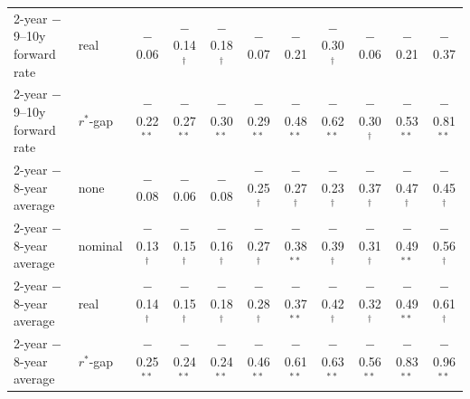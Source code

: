\begin{tabular}{llccccccccc}
2-year $-$ 9--10y forward rate & real & $-$0.06 & $-$0.14$^{\dagger}$ & $-$0.18$^{\dagger}$ & $-$0.07 & $-$0.21 & $-$0.30$^{\dagger}$ & $-$0.06 & $-$0.21 & $-$0.37 \\
2-year $-$ 9--10y forward rate & $r^*$-gap & $-$0.22$^{**}$ & $-$0.27$^{**}$ & $-$0.30$^{**}$ & $-$0.29$^{**}$ & $-$0.48$^{**}$ & $-$0.62$^{**}$ & $-$0.30$^{\dagger}$ & $-$0.53$^{**}$ & $-$0.81$^{**}$ \\
\midrule
2-year $-$ 8-year average & none & $-$0.08 & $-$0.06 & $-$0.08 & $-$0.25$^{\dagger}$ & $-$0.27$^{\dagger}$ & $-$0.23$^{\dagger}$ & $-$0.37$^{\dagger}$ & $-$0.47$^{\dagger}$ & $-$0.45$^{\dagger}$ \\
2-year $-$ 8-year average & nominal & $-$0.13$^{\dagger}$ & $-$0.15$^{\dagger}$ & $-$0.16$^{\dagger}$ & $-$0.27$^{\dagger}$ & $-$0.38$^{**}$ & $-$0.39$^{\dagger}$ & $-$0.31$^{\dagger}$ & $-$0.49$^{**}$ & $-$0.56$^{\dagger}$ \\
2-year $-$ 8-year average & real & $-$0.14$^{\dagger}$ & $-$0.15$^{\dagger}$ & $-$0.18$^{\dagger}$ & $-$0.28$^{\dagger}$ & $-$0.37$^{**}$ & $-$0.42$^{\dagger}$ & $-$0.32$^{\dagger}$ & $-$0.49$^{**}$ & $-$0.61$^{\dagger}$ \\
2-year $-$ 8-year average & $r^*$-gap & $-$0.25$^{**}$ & $-$0.24$^{**}$ & $-$0.24$^{**}$ & $-$0.46$^{**}$ & $-$0.61$^{**}$ & $-$0.63$^{**}$ & $-$0.56$^{**}$ & $-$0.83$^{**}$ & $-$0.96$^{**}$ \\
\bottomrule
\end{tabular}
